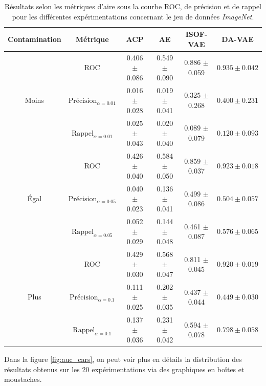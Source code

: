 \begin{table}[h]
	\centering
	\caption{Résultats selon les métriques d'aire sous la courbe ROC, de précision et de rappel pour les différentes expérimentations concernant le jeu de données \textit{ImageNet}.}
	\begin{tabular}{c|c|c c c c}
		\toprule
		Contamination & Métrique & ACP & AE & ISOF-VAE & DA-VAE \\
		\hline
		\multirow{3}{*}{Moins} 
		& ROC & 0.406 $\pm$ 0.086 & 0.549 $\pm$ 0.090 & 0.886 $\pm$ 0.059 & $\mathbf{0.935 \pm 0.042}$  \\ 
		& $\text{Précision}_{\alpha=0.01}$ & 0.016 $\pm$ 0.028 & 0.019 $\pm$ 0.041 & 0.325 $\pm$ 0.268 & $\mathbf{0.400 \pm 0.231}$  \\
		& $\text{Rappel}_{\alpha=0.01}$ & 0.025 $\pm$ 0.043 & 0.020 $\pm$ 0.040 & 0.089 $\pm$ 0.079 & $\mathbf{0.120 \pm 0.093}$  \\
		\midrule
		\multirow{3}{*}{Égal} 
		& ROC & 0.426 $\pm$ 0.040 & 0.584 $\pm$ 0.050 & 0.859 $\pm$ 0.037 & $\mathbf{0.923 \pm 0.018}$  \\ 
		& $\text{Précision}_{\alpha=0.05}$ & 0.040 $\pm$ 0.023 & 0.136 $\pm$ 0.041 & 0.499 $\pm$ 0.086 & $\mathbf{0.504 \pm 0.057}$  \\
		& $\text{Rappel}_{\alpha=0.05}$ & 0.052 $\pm$ 0.029 & 0.144 $\pm$ 0.048 & 0.461 $\pm$ 0.087 & $\mathbf{0.576 \pm 0.065}$  \\
		\midrule
		\multirow{3}{*}{Plus} 
		& ROC & 0.429 $\pm$ 0.030 & 0.568 $\pm$ 0.047 & 0.811 $\pm$ 0.045 & $\mathbf{0.920 \pm 0.019}$  \\ 
		& $\text{Précision}_{\alpha=0.1}$ & 0.111 $\pm$ 0.025 & 0.202 $\pm$ 0.035 & 0.437 $\pm$ 0.044 & $\mathbf{0.449 \pm 0.030}$  \\
		& $\text{Rappel}_{\alpha=0.1}$ & 0.137 $\pm$ 0.036 & 0.231 $\pm$ 0.042 & 0.594 $\pm$ 0.078 & $\mathbf{0.798 \pm 0.058}$  \\
		\midrule
	\end{tabular} 
	\label{tab:results_cars}
\end{table}

Dans la figure \ref{fig:auc_cars}, on peut voir plus en détails la distribution des résultats obtenus sur les 20 expérimentations via des graphiques en boîtes et moustaches.

